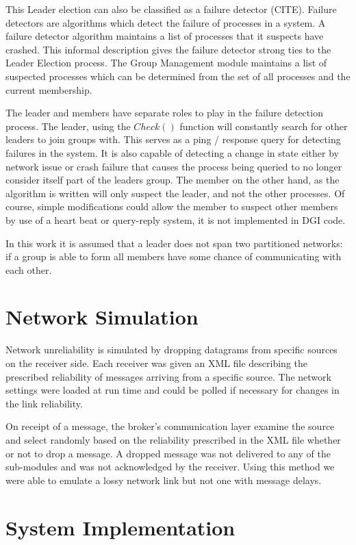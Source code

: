This Leader election can also be classified as a failure detector 
(CITE). Failure detectors are algorithms which detect the failure of processes in a 
system. A failure detector algorithm maintains a list of processes that it suspects have
crashed. This informal description gives the failure detector strong ties to the
Leader Election process. The Group Management module maintains a list of 
suspected processes which can be determined from the set of all processes and the current
membership. 

The leader and members have separate roles to play in the failure detection
process. The leader, using the $Check()$ function will constantly search for 
other leaders to join groups with. This serves as a ping / response query for 
detecting failures in the system. It is also capable of detecting a change in state either
by network issue or crash failure that causes the process being queried to no 
longer consider itself part of the leaders group. The member on the other hand, as the
algorithm is written will only suspect the leader, and not the other processes.
Of course, simple modifications could allow the member to suspect other members
by use of a heart beat or query-reply system, it is not implemented in DGI code.

In this work it is assumed that a leader does not span two partitioned networks:
if a group is able to form all members have some chance of communicating with
each other.

\section{Network Simulation}

Network unreliability is simulated by dropping datagrams from specific sources 
on the receiver side. Each receiver was given an XML file describing the 
prescribed reliability of messages arriving from a specific source. The 
network settings were loaded at run time and could be polled if necessary for 
changes in the link reliability.

On receipt of a message, the broker's communication layer examine the source 
and select randomly based on the reliability prescribed in the XML file whether 
or not to drop a message. A dropped message was not delivered to any of the 
sub-modules and was not acknowledged by the receiver. Using this method we were 
able to emulate a lossy network link but not one with message delays.

\section{System Implementation}

